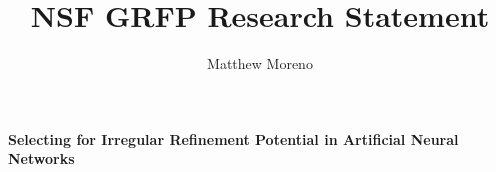 \documentclass[a4paper]{article}
\title{NSF GRFP Research Statement}
\author{Matthew Moreno}
\begin{document}
\begin{center}
{
 \textbf{Selecting for Irregular Refinement Potential in Artificial Neural Networks}
}
\end{center}
\vspace{-4ex}
\doublespacing













%

%

%
\end{document}
